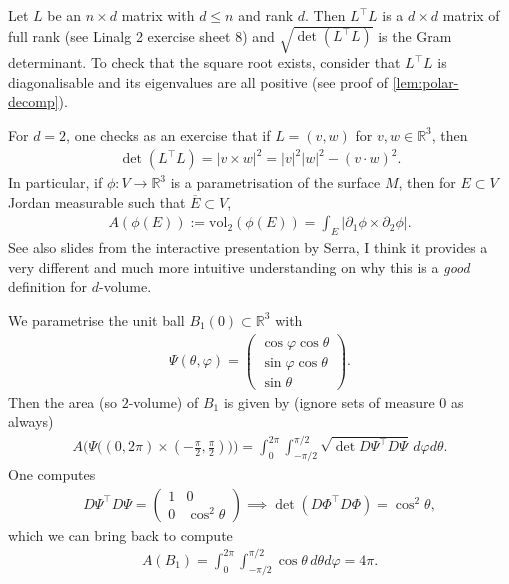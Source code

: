 \begin{remark}
	Let $L$ be an $n \times d$ matrix with $d \leq n$ and rank $d$. Then $L^\top L$ is a $d \times d$ matrix of full rank (see Linalg 2 exercise sheet 8) and $\sqrt{\det (L^\top L)}$ is the Gram determinant. To check that the square root exists, consider that $L^\top L$ is diagonalisable and its eigenvalues are all positive (see proof of \ref{lem:polar-decomp}).

	For $d = 2$, one checks as an exercise that if $L = (v,w)$ for $v,w \in \mathbb{R}^{3}$, then
	\begin{align*}
		\det (L^\top L) = \left| v \times w \right|^{2} = \left| v \right|^{2} \left| w \right|^{2} - (v \cdot w)^{2}.
	\end{align*}
	In particular, if $\phi: V \to \mathbb{R}^{3}$ is a parametrisation of the surface $M$, then for $E \subset V$ Jordan measurable such that $\overline{ E } \subset V$,
	\begin{align*}
		A(\phi(E)) := \text{vol}_{2}(\phi(E)) = \int_{E} \left| \partial_{1} \phi \times \partial_{2} \phi \right|.
	\end{align*}
	See also slides from the interactive presentation by Serra, I think it provides a very different and much more intuitive understanding on why this is a \textit{good} definition for $d$-volume.
\end{remark}

\begin{eg} 
	We parametrise the unit ball $B_{1}(0) \subset \mathbb{R}^{3}$ with
	\begin{align*}
		\Psi(\theta, \varphi) =
		\begin{pmatrix}
			\cos\varphi \cos \theta  \\
			\sin \varphi \cos \theta \\
			\sin\theta
		\end{pmatrix}.
	\end{align*}
	Then the area (so $2$-volume) of $B_{1}$ is given by (ignore sets of measure $0$ as always)
	\begin{align*}
		A\Big(\Psi\Big((0,2\pi) \times (-\tfrac{\pi}{2}, \tfrac{\pi}{2})\Big)\Big) = \int_{0}^{2\pi} \int_{-\pi / 2}^{\pi / 2} \sqrt{\det D \Psi^\top D \Psi}  \, d\varphi d\theta.
	\end{align*}
	One computes
	\begin{align*}
		D \Psi^\top D \Psi =
		\begin{pmatrix}
			1 & 0 \\ 0 & \cos^{2}\theta
		\end{pmatrix} \implies \det (D \Phi^\top D \Phi) = \cos^{2} \theta,
	\end{align*}
	which we can bring back to compute
	\begin{align*}
		A (B_{1}) = \int_{0}^{2\pi} \int_{-\pi / 2}^{ \pi / 2} \cos\theta  \, d\theta  d\varphi = 4 \pi.
	\end{align*}
\end{eg}

